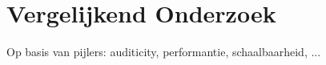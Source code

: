
\chapter{Vergelijkend Onderzoek}
\label{ch:vergelijkendonderzoek}

Op basis van pijlers: auditicity, performantie, schaalbaarheid, ...